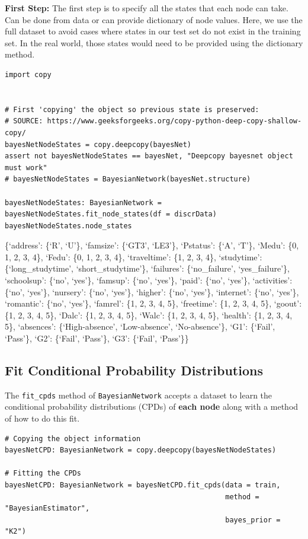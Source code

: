 \documentclass[
]{article}
\begin{document}
\textbf{First Step:} The first step is to specify all the states that
each node can take. Can be done from data or can provide dictionary of
node values. Here, we use the full dataset to avoid cases where states
in our test set do not exist in the training set. In the real world,
those states would need to be provided using the dictionary method.

\begin{verbatim}
import copy


# First 'copying' the object so previous state is preserved:
# SOURCE: https://www.geeksforgeeks.org/copy-python-deep-copy-shallow-copy/
bayesNetNodeStates = copy.deepcopy(bayesNet)
assert not bayesNetNodeStates == bayesNet, "Deepcopy bayesnet object must work"
# bayesNetNodeStates = BayesianNetwork(bayesNet.structure)

bayesNetNodeStates: BayesianNetwork = bayesNetNodeStates.fit_node_states(df = discrData)
bayesNetNodeStates.node_states
\end{verbatim}

\{`address': \{`R', `U'\}, `famsize': \{`GT3', `LE3'\}, `Pstatus':
\{`A', `T'\}, `Medu': \{0, 1, 2, 3, 4\}, `Fedu': \{0, 1, 2, 3, 4\},
`traveltime': \{1, 2, 3, 4\}, `studytime': \{`long\_studytime',
`short\_studytime'\}, `failures': \{`no\_failure', `yes\_failure'\},
`schoolsup': \{`no', `yes'\}, `famsup': \{`no', `yes'\}, `paid': \{`no',
`yes'\}, `activities': \{`no', `yes'\}, `nursery': \{`no', `yes'\},
`higher': \{`no', `yes'\}, `internet': \{`no', `yes'\}, `romantic':
\{`no', `yes'\}, `famrel': \{1, 2, 3, 4, 5\}, `freetime': \{1, 2, 3, 4,
5\}, `goout': \{1, 2, 3, 4, 5\}, `Dalc': \{1, 2, 3, 4, 5\}, `Walc': \{1,
2, 3, 4, 5\}, `health': \{1, 2, 3, 4, 5\}, `absences': \{`High-absence',
`Low-absence', `No-absence'\}, `G1': \{`Fail', `Pass'\}, `G2': \{`Fail',
`Pass'\}, `G3': \{`Fail', `Pass'\}\}

\hypertarget{fit-conditional-probability-distributions}{%
\subsection{Fit Conditional Probability
Distributions}\label{fit-conditional-probability-distributions}}

The \texttt{fit_cpds} method of
\texttt{BayesianNetwork} accepts a dataset to learn the
conditional probability distributions (CPDs) of \textbf{each node} along
with a method of how to do this fit.

\begin{verbatim}
# Copying the object information
bayesNetCPD: BayesianNetwork = copy.deepcopy(bayesNetNodeStates)

# Fitting the CPDs
bayesNetCPD: BayesianNetwork = bayesNetCPD.fit_cpds(data = train,
                                                    method = "BayesianEstimator",
                                                    bayes_prior = "K2")
\end{verbatim}
\end{document}
